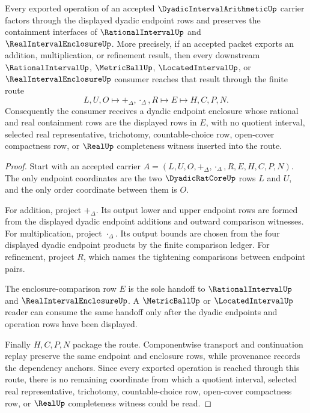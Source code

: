 \begin{theorem}
\label{thm:dyadic-interval-arithmetic-enclosure-soundness}
Every exported operation of an accepted $\DyadicIntervalArithmeticUp$ carrier factors through the displayed dyadic endpoint rows and preserves the containment interfaces of $\RationalIntervalUp$ and $\RealIntervalEnclosureUp$. More precisely, if an accepted packet exports an addition, multiplication, or refinement result, then every downstream $\RationalIntervalUp$, $\MetricBallUp$, $\LocatedIntervalUp$, or $\RealIntervalEnclosureUp$ consumer reaches that result through the finite route
$$
L,U,O \longmapsto +_\Delta,\cdot_\Delta,R \longmapsto E \longmapsto H,C,P,N .
$$
Consequently the consumer receives a dyadic endpoint enclosure whose rational and real containment rows are the displayed rows in $E$, with no quotient interval, selected real representative, trichotomy, countable-choice row, open-cover compactness row, or $\RealUp$ completeness witness inserted into the route.
\end{theorem}
\begin{proof}
Start with an accepted carrier $A=(L,U,O,+_\Delta,\cdot_\Delta,R,E,H,C,P,N)$. The only endpoint coordinates are the two $\DyadicRatCoreUp$ rows $L$ and $U$, and the only order coordinate between them is $O$.

For addition, project $+_\Delta$. Its output lower and upper endpoint rows are formed from the displayed dyadic endpoint additions and outward comparison witnesses. For multiplication, project $\cdot_\Delta$. Its output bounds are chosen from the four displayed dyadic endpoint products by the finite comparison ledger. For refinement, project $R$, which names the tightening comparisons between endpoint pairs.

The enclosure-comparison row $E$ is the sole handoff to $\RationalIntervalUp$ and $\RealIntervalEnclosureUp$. A $\MetricBallUp$ or $\LocatedIntervalUp$ reader can consume the same handoff only after the dyadic endpoints and operation rows have been displayed.

Finally $H,C,P,N$ package the route. Componentwise transport and continuation replay preserve the same endpoint and enclosure rows, while provenance records the dependency anchors. Since every exported operation is reached through this route, there is no remaining coordinate from which a quotient interval, selected real representative, trichotomy, countable-choice row, open-cover compactness row, or $\RealUp$ completeness witness could be read.
\end{proof}

